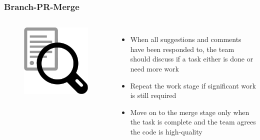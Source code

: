 \documentclass[aspectratio=169]{beamer} %
\begin{document}
\begin{frame}
	\frametitle{Branch-PR-Merge }
	\begin{columns}[c]

		\begin{figure}
			\centering
			\includegraphics[width=.6\textwidth]{./img/qa.png}
		\end{figure}

		\begin{itemize}
			\setlength\itemsep{1em}
			\item When all suggestions and comments
			have been responded to,
			the team should discuss if a task either 
			is done or need more work 
			\item Repeat the work stage 
			if significant work is still required
			\item Move on to the merge stage 
			only when the task is complete and 
			the team agrees the code is high-quality
		\end{itemize}

	\end{columns}
\end{frame}
\end{document}
